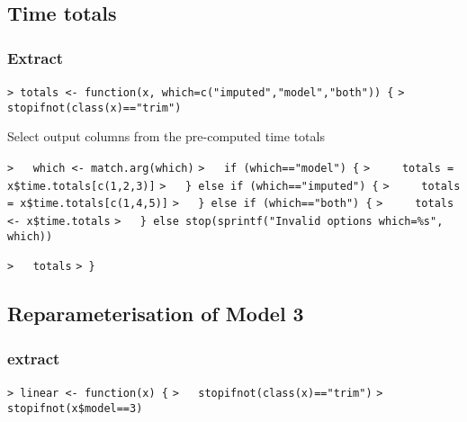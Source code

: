 \documentclass[a4paper]{article}
\begin{document}
\subsection{Time totals}\par



\subsubsection{Extract}\par

\verb~> totals <- function(x, which=c("imputed","model","both")) {~\newline
\verb~>   stopifnot(class(x)=="trim")~\par

Select output columns from the pre-computed time totals\par
\verb~>   which <- match.arg(which)~\newline
\verb~>   if (which=="model") {~\newline
\verb~>     totals = x$time.totals[c(1,2,3)]~\newline
\verb~>   } else if (which=="imputed") {~\newline
\verb~>     totals = x$time.totals[c(1,4,5)]~\newline
\verb~>   } else if (which=="both") {~\newline
\verb~>     totals <- x$time.totals~\newline
\verb~>   } else stop(sprintf("Invalid options which=%s", which))~\par

\verb~>   totals~\newline
\verb~> }~\par





\subsection{Reparameterisation of Model 3}\par



\subsubsection{extract}\par

\verb~> linear <- function(x) {~\newline
\verb~>   stopifnot(class(x)=="trim")~\newline
\verb~>   stopifnot(x$model==3)~\par
\end{document}
